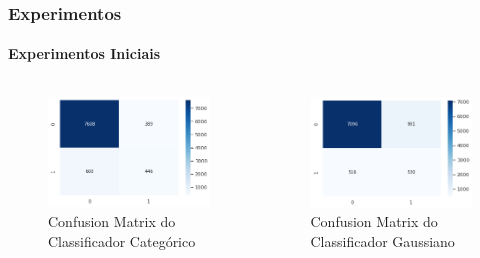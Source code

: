 \documentclass{beamer}
\begin{document}
\begin{frame}
    \frametitle{Experimentos}
    \framesubtitle{Experimentos Iniciais}
    \begin{columns}
        \begin{column}{0.5\textwidth}
            \begin{figure}[H]
                \centerline{\includegraphics[width=1.0\textwidth]{IMGS/cm-categorico.png}}
                
                \caption{\label{fig:cm1-cnb}Confusion Matrix do Classificador Categórico}
                \end{figure}
        \end{column}
        \begin{column}{0.5\textwidth}
            \begin{figure}[H]
                \centerline{\includegraphics[width=1.0\textwidth]{IMGS/cm-gaussiano.png}}
                \label{cm1-gnb}
                \caption{\label{fig:cm1-gnb}Confusion Matrix do Classificador Gaussiano}
                \end{figure}
        \end{column}
        \end{columns}    
\end{frame}
\end{document}
